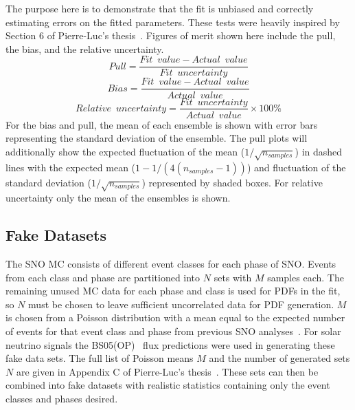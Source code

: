 The purpose here is to demonstrate that the fit is unbiased and correctly estimating errors on the fitted parameters. 
These tests were heavily inspired by Section 6 of Pierre-Luc's thesis~\cite{plthesis}.
Figures of merit shown here include the pull, the bias, and the relative uncertainty.
\begin{equation}
Pull = \frac{Fit\,\,\,value - Actual\,\,\,value}{Fit\,\,\,uncertainty}
\end{equation}
\begin{equation}
Bias = \frac{Fit\,\,\,value - Actual\,\,\,value}{Actual\,\,\,value}
\end{equation}
\begin{equation}
Relative\,\,\,uncertainty = \frac{Fit\,\,\,uncertainty}{Actual\,\,\,value} \times 100\%
\end{equation}
For the bias and pull, the mean of each ensemble is shown with error bars representing the standard deviation of the ensemble.
The pull plots will additionally show the expected fluctuation of the mean ($1/\sqrt{n_{samples}}$) in dashed lines with the expected mean ($1 - 1/(4(n_{samples}-1))$) and fluctuation of the standard deviation ($1/\sqrt{n_{samples}}$) represented by shaded boxes.
For relative uncertainty only the mean of the ensembles is shown.

\subsection{Fake Datasets}

The SNO MC consists of different event classes for each phase of SNO.
Events from each class and phase are partitioned into $N$ sets with $M$ samples each. 
The remaining unused MC data for each phase and class is used for PDFs in the fit, so $N$ must be chosen to leave sufficient uncorrelated data for PDF generation.
$M$ is chosen from a Poisson distribution with a mean equal to the expected number of events for that event class and phase from previous SNO analyses~\cite{leta,ncd,3phase}.
For solar neutrino signals the BS05(OP)~\cite{bs05op} flux predictions were used in generating these fake data sets.
The full list of Poisson means $M$ and the number of generated sets $N$ are given in Appendix C of Pierre-Luc's thesis~\cite{plthesis}.
These sets can then be combined into fake datasets with realistic statistics containing only the event classes and phases desired.


